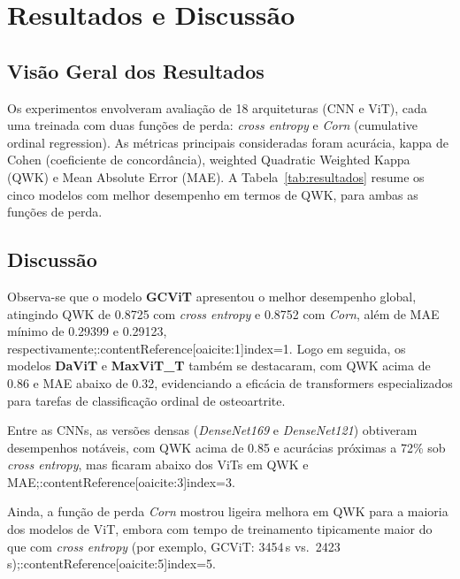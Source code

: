 \section{Resultados e Discussão}

\subsection{Visão Geral dos Resultados}

Os experimentos envolveram avaliação de 18 arquiteturas (CNN e ViT), cada uma treinada com duas funções de perda: \emph{cross entropy} e \emph{Corn} (cumulative ordinal regression). As métricas principais consideradas foram acurácia, kappa de Cohen (coeficiente de concordância), weighted Quadratic Weighted Kappa (QWK) e Mean Absolute Error (MAE). A Tabela~\ref{tab:resultados} resume os cinco modelos com melhor desempenho em termos de QWK, para ambas as funções de perda.

\subsection{Discussão}

Observa-se que o modelo \textbf{GCViT} apresentou o melhor desempenho global, atingindo QWK de 0.8725 com \emph{cross entropy} e 0.8752 com \emph{Corn}, além de MAE mínimo de 0.29399 e 0.29123, respectivamente;:contentReference[oaicite:1]{index=1}. Logo em seguida, os modelos \textbf{DaViT} e \textbf{MaxViT\_T} também se destacaram, com QWK acima de 0.86 e MAE abaixo de 0.32, evidenciando a eficácia de transformers especializados para tarefas de classificação ordinal de osteoartrite.

Entre as CNNs, as versões densas (\emph{DenseNet169} e \emph{DenseNet121}) obtiveram desempenhos notáveis, com QWK acima de 0.85 e acurácias próximas a 72\% sob \emph{cross entropy}, mas ficaram abaixo dos ViTs em QWK e MAE;:contentReference[oaicite:3]{index=3}.

Ainda, a função de perda \emph{Corn} mostrou ligeira melhora em QWK para a maioria dos modelos de ViT, embora com tempo de treinamento tipicamente maior do que com \emph{cross entropy} (por exemplo, GCViT: 3454\,s vs.\ 2423\,s);:contentReference[oaicite:5]{index=5}.

